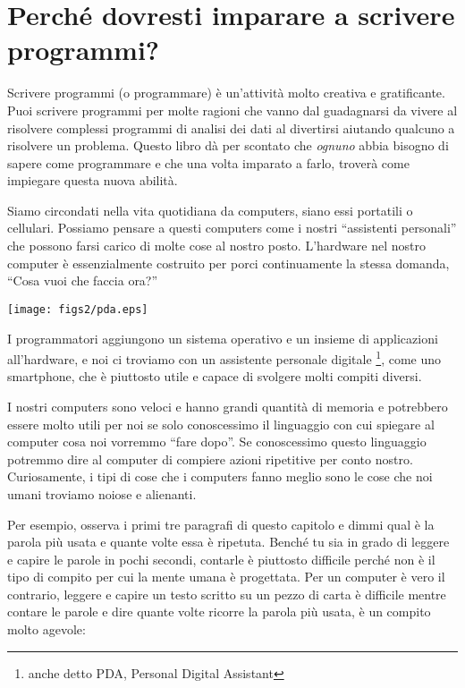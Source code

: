 
\chapter{Perch\'{e} dovresti imparare a scrivere programmi?}

Scrivere programmi (o programmare) \`{e} un'attivit\`{a} molto creativa e gratificante. Puoi scrivere programmi per molte ragioni che vanno dal guadagnarsi da vivere al risolvere complessi programmi di analisi dei dati al divertirsi aiutando qualcuno a risolvere un problema. Questo libro d\`{a} per scontato che \emph{ognuno} abbia bisogno di sapere come programmare e che una volta imparato a farlo,  trover\`{a} come impiegare questa nuova abilit\`{a}.


Siamo circondati nella vita quotidiana da computers, siano essi portatili o cellulari. Possiamo pensare a questi computers come i nostri {``}assistenti personali'' che possono farsi carico di molte cose al nostro posto. L'hardware nel nostro computer \`{e} essenzialmente costruito per porci continuamente la stessa domanda, {``}Cosa vuoi che faccia ora?''

\beforefig
\centerline{\texttt{[image: figs2/pda.eps]}}
\afterfig

I programmatori aggiungono un sistema operativo e un insieme di applicazioni all'hardware, e noi ci troviamo con un assistente personale digitale \footnote{anche detto PDA, Personal Digital Assistant}, come uno smartphone, che \`{e} piuttosto utile e capace di svolgere molti compiti diversi.


I nostri computers sono veloci e hanno grandi quantit\`{a} di memoria e potrebbero essere molto utili per noi se solo conoscessimo il linguaggio con cui spiegare al computer cosa noi vorremmo {``}fare dopo''. Se conoscessimo questo linguaggio potremmo dire al computer di compiere azioni ripetitive per conto nostro. Curiosamente, i tipi di cose che i computers fanno meglio sono le cose che noi umani troviamo noiose e alienanti.


Per esempio, osserva i primi tre paragrafi di questo capitolo e dimmi qual \`{e} la parola pi\`{u} usata e quante volte essa \`{e} ripetuta. Bench\'{e} tu sia in grado di leggere e capire le parole in pochi secondi, contarle \`{e} piuttosto difficile perch\'{e} non \`{e} il tipo di compito per cui la mente umana \`{e} progettata. Per un computer \`{e} vero il contrario, leggere e capire un testo scritto su un pezzo di carta \`{e} difficile mentre contare le parole e dire quante volte ricorre la parola pi\`{u} usata, \`{e} un compito molto agevole:

